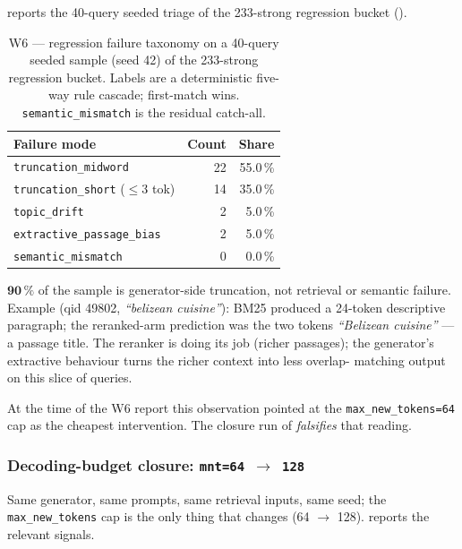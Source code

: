 \documentclass[11pt,a4paper]{article}
\newcommand{\bmtwofive}{BM25}
\begin{document}
 reports the 40-query seeded triage of the
233-strong regression bucket ().

\begin{table}[H]
  \centering
  \caption{W6 --- regression failure taxonomy on a 40-query seeded
  sample (seed 42) of the 233-strong regression bucket.  Labels are
  a deterministic five-way rule cascade; first-match wins.
  \texttt{semantic\_mismatch} is the residual catch-all.}
  \label{tab:w6-taxonomy}
  \begin{tabular}{lrr}
    \toprule
    Failure mode                & Count & Share \\
    \midrule
    \texttt{truncation\_midword}      & 22 & 55.0\,\% \\
    \texttt{truncation\_short} ($\leq\!3$ tok) & 14 & 35.0\,\% \\
    \texttt{topic\_drift}             &  2 &  5.0\,\% \\
    \texttt{extractive\_passage\_bias} & 2 &  5.0\,\% \\
    \texttt{semantic\_mismatch}       &  0 &  0.0\,\% \\
    \bottomrule
  \end{tabular}
\end{table}

$\mathbf{90\,\%}$ of the sample is generator-side truncation, not
retrieval or semantic failure.  Example (qid 49802,
\emph{``belizean cuisine''}): \bmtwofive{} produced a 24-token
descriptive paragraph; the reranked-arm prediction was the two
tokens \emph{``Belizean cuisine''} --- a passage title.  The
reranker is doing its job (richer passages); the generator's
extractive behaviour turns the richer context into less overlap-
matching output on this slice of queries.

At the time of the W6 report this observation pointed at the
\texttt{max\_new\_tokens=64} cap as the cheapest intervention.  The
closure run of  \emph{falsifies} that reading.

\subsubsection{Decoding-budget closure: \texttt{mnt=64 $\to$ 128}}
\label{sec:w6-closure}

Same generator, same prompts, same retrieval inputs, same seed; the
\texttt{max\_new\_tokens} cap is the only thing that changes
(64 $\to$ 128).   reports the relevant signals.
\end{document}
